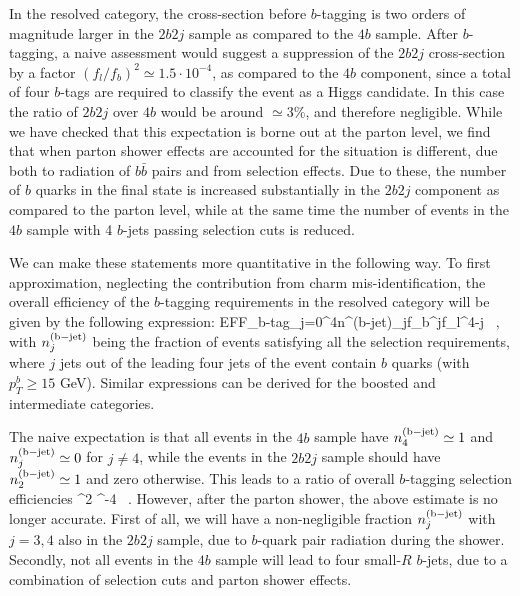 In the resolved category, 
the cross-section  before
$b$-tagging is two orders
of magnitude larger in the $2b2j$
sample as compared to the $4b$ sample.
%
After $b$-tagging, a naive assessment would
suggest a suppression of the $2b2j$ cross-section by a factor $(f_l/f_b)^2 \simeq
1.5\cdot 10^{-4}$, as compared to the $4b$ component,
since a total of four $b$-tags are required to classify the
event as a Higgs candidate.
%
In this case the ratio of $2b2j$ over $4b$ would be
around $\simeq 3\%$, and therefore negligible.
While  we have checked that this expectation is borne
out at the parton level,
we find that  when parton shower effects
are accounted for the situation is different, due both to radiation of $b\bar{b}$ pairs
and from selection effects.
%
Due to these,
the
number of  $b$ quarks in the  final state is
increased substantially in the $2b2j$ component as compared
to the parton level, while at the same
time the number of events in the $4b$ sample
with 4 $b$-jets passing selection cuts is reduced.

We can make these statements more quantitative in the following way.
%
To first approximation, neglecting the contribution from
charm mis-identification,
the
overall efficiency of the $b$-tagging requirements in the resolved category will be
given by the following expression:
\be
\label{btaggingeff}
{\rm EFF}_{\rm b-tag}\simeq \sum_{j=0}^{4}n^{\rm (b-jet)}_j\cdot f_b^{j}\cdot f_l^{4-j} \, ,
\ee
with $n^{\rm (b-jet)}_j$ being the fraction of events satisfying all the selection
requirements,
where $j$ jets out of the leading four jets of the event
contain $b$ quarks (with $p_T^b\ge 15$
GeV).
%
Similar expressions can be derived for
the boosted and intermediate categories.
%

The naive expectation is that all events in the $4b$ sample have $n^{\rm (b-jet)}_4\simeq 1$
and $n^{\rm (b-jet)}_j\simeq 0$ for $j\ne 4$, while the events in the $2b2j$ sample
should have $n^{\rm (b-jet)}_2\simeq 1$ and zero otherwise.
%
This leads to a ratio of overall $b$-tagging selection efficiencies
\be
\label{eq:naive}
  \simeq
 \lp {}\rp^2 ^{-4} \, .
\ee
However, after the parton shower, the above estimate is no longer accurate.
%
First of all, we will have a non-negligible fraction $n^{\rm (b-jet)}_j$
with $j=3,4$ also in the $2b2j$ sample, due to $b$-quark pair radiation
during the shower.
%
Secondly, not all events in the $4b$ sample will lead to four small-$R$ $b$-jets,
due to a combination of selection cuts and
parton shower effects.
%

